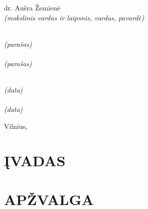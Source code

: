 \documentclass[]{vgtuef}
\begin{document}
\begin{titlepage}
\begin{flushright}
\begin{minipage}[t]{.4\linewidth}
        \normalsize{dr. Aušra Žemienė} \\
        \scriptsize{\textit{(mokslinis vardas ir laipsnis, vardas, pavardė)}} \\
      \end{minipage}
      \begin{minipage}[t]{0.15\textwidth}
        \makebox[0.9in]{\hrulefill}\\
        \scriptsize{\textit{(parašas)}} \\
        \makebox[0.9in]{\hrulefill}\\
        \scriptsize{\textit{(parašas)}} \\
      \end{minipage}
      \begin{minipage}[t]{0.03\textwidth}
        \makebox[0.45in]{\hrulefill}\\
        \scriptsize{\textit{(data)}} \\
        \makebox[0.45in]{\hrulefill}\\
        \scriptsize{\textit{(data)}} \\
      \end{minipage}
    \end{flushright}
    \vfill
    \begin{center}
      {\large Vilnius, \the\year} 
    \end{center}
  \end{titlepage}

  \newpage\null\thispagestyle{empty}\newpage

  \setcounter{page}{9}

  
  
  \newpage
  \newpage\null\thispagestyle{empty}\newpage

  \tableofcontents

  \newpage

  \section*{ĮVADAS}

  

  \section{APŽVALGA}

  

  
\end{document}
